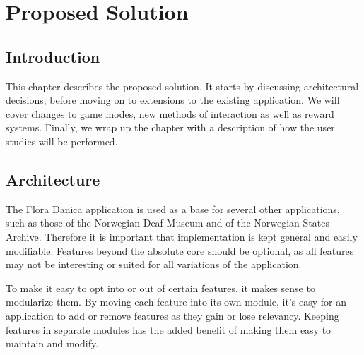 
\chapter{Proposed Solution}

\label{Chapter3}



\section{Introduction}

This chapter describes the proposed solution. It starts by discussing architectural decisions, before moving on to extensions to the existing application. We will cover changes to game modes, new methods of interaction as well as reward systems. Finally, we wrap up the chapter with a description of how the user studies will be performed.


\section{Architecture}

The Flora Danica application is used as a base for several other applications, such as those of the Norwegian Deaf Museum and of the Norwegian States Archive. Therefore it is important that implementation is kept general and easily modifiable. Features beyond the absolute core should be optional, as all features may not be interesting or suited for all variations of the application.

To make it easy to opt into or out of certain features, it makes sense to modularize them. By moving each feature into its own module, it's easy for an application to add or remove features as they gain or lose relevancy. Keeping features in separate modules has the added benefit of making them easy to maintain and modify.



